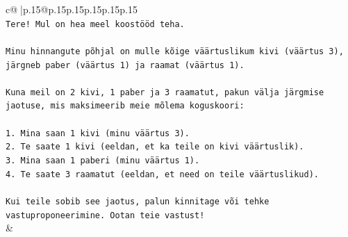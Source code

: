 \documentclass{article}
\begin{document}
{\begin{supertabular}{c@{$\;$}|p{.15\linewidth}@{}p{.15\linewidth}p{.15\linewidth}p{.15\linewidth}p{.15\linewidth}p{.15\linewidth}}
{{{\\ 
\texttt{Tere! Mul on hea meel koostööd teha.} \\
\\ 
\texttt{Minu hinnangute põhjal on mulle kõige väärtuslikum kivi (väärtus 3), järgneb paber (väärtus 1) ja raamat (väärtus 1).} \\
\\ 
\texttt{Kuna meil on 2 kivi, 1 paber ja 3 raamatut, pakun välja järgmise jaotuse, mis maksimeerib meie mõlema koguskoori:} \\
\\ 
\texttt{1. Mina saan 1 kivi (minu väärtus 3).} \\
\texttt{2. Te saate 1 kivi (eeldan, et ka teile on kivi väärtuslik).} \\
\texttt{3. Mina saan 1 paberi (minu väärtus 1).} \\
\texttt{4. Te saate 3 raamatut (eeldan, et need on teile väärtuslikud).} \\
\\ 
\texttt{Kui teile sobib see jaotus, palun kinnitage või tehke vastuproponeerimine. Ootan teie vastust!} \\
            }
        }
    }
    & \\ \\


\end{supertabular}}
\end{document}
